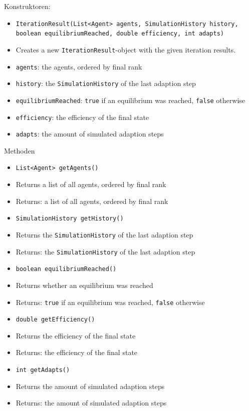 \documentclass[parskip=full,11pt]{scrartcl}
\begin{document}
Konstruktoren:
\begin{itemize}\itemsep -10pt
\item \texttt{IterationResult(List<Agent> agents, SimulationHistory history, boolean equilibriumReached, double efficiency, int adapts)}
\item[] Creates a new \texttt{IterationResult}-object with the given iteration results.
\item[] \texttt{agents}: the agents, ordered by final rank
\item[] \texttt{history}: the \texttt{SimulationHistory} of the last adaption step
\item[] \texttt{equilibriumReached}: \texttt{true} if an equilibrium was reached, \texttt{false} otherwise
\item[] \texttt{efficiency}: the efficiency of the final state
\item[] \texttt{adapts}: the amount of simulated adaption steps
\end{itemize}

Methoden
\begin{itemize}\itemsep -10pt
\item \texttt{List<Agent> getAgents()}
\item[] Returns a list of all agents, ordered by final rank
\item[] Returns: a list of all agents, ordered by final rank

\item \texttt{SimulationHistory getHistory()}
\item[] Returns the \texttt{SimulationHistory} of the last adaption step
\item[] Returns: the \texttt{SimulationHistory} of the last adaption step

\item \texttt{boolean equilibriumReached()}
\item[] Returns whether an equilibrium was reached
\item[] Returns: \texttt{true} if an equilibrium was reached, \texttt{false} otherwise

\item \texttt{double getEfficiency()}
\item[] Returns the efficiency of the final state
\item[] Returns: the efficiency of the final state

\item \texttt{int getAdapts()}
\item[] Returns the amount of simulated adaption steps
\item[] Returns: the amount of simulated adaption steps
\end{itemize}
\end{document}
